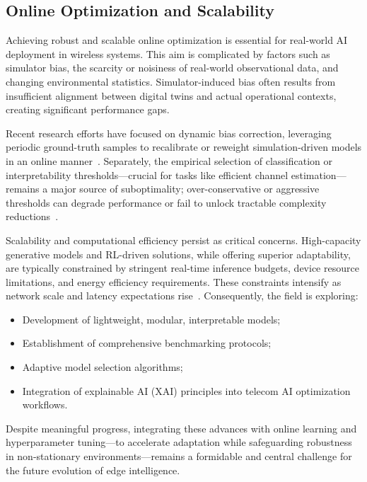 \documentclass[11pt]{article}
\begin{document}
\subsection{Online Optimization and Scalability}

Achieving robust and scalable online optimization is essential for real-world AI deployment in wireless systems. This aim is complicated by factors such as simulator bias, the scarcity or noisiness of real-world observational data, and changing environmental statistics. Simulator-induced bias often results from insufficient alignment between digital twins and actual operational contexts, creating significant performance gaps.

Recent research efforts have focused on dynamic bias correction, leveraging periodic ground-truth samples to recalibrate or reweight simulation-driven models in an online manner~\cite{ref37,ref38}. Separately, the empirical selection of classification or interpretability thresholds—crucial for tasks like efficient channel estimation—remains a major source of suboptimality; over-conservative or aggressive thresholds can degrade performance or fail to unlock tractable complexity reductions~\cite{ref41}.

Scalability and computational efficiency persist as critical concerns. High-capacity generative models and RL-driven solutions, while offering superior adaptability, are typically constrained by stringent real-time inference budgets, device resource limitations, and energy efficiency requirements. These constraints intensify as network scale and latency expectations rise~\cite{ref43,ref44,ref48}. Consequently, the field is exploring:

\begin{itemize}
    \item Development of lightweight, modular, interpretable models;
    \item Establishment of comprehensive benchmarking protocols;
    \item Adaptive model selection algorithms;
    \item Integration of explainable AI (XAI) principles into telecom AI optimization workflows.
\end{itemize}

Despite meaningful progress, integrating these advances with online learning and hyperparameter tuning—to accelerate adaptation while safeguarding robustness in non-stationary environments—remains a formidable and central challenge for the future evolution of edge intelligence.
\end{document}
